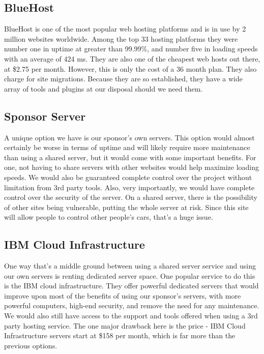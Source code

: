 \documentclass[onecolumn, draftclsnofoot,10pt, compsoc]{IEEEtran}
\begin{document}
    \subsection{BlueHost}
    
        BlueHost is one of the most popular web hosting platforms and is in use by 2 million websites worldwide. 
        Among the top 33 hosting platforms they were number one in uptime at greater than 99.99\%, and number five in loading speeds with an average of 424 ms. 
        They are also one of the cheapest web hosts out there, at \$2.75 per month. 
        However, this is only the cost of a 36 month plan. 
        They also charge for site migrations.
        Because they are so established, they have a wide array of tools and plugins at our disposal should we need them\cite{e9}.
    
    \subsection{Sponsor Server}
    
        A unique option we have is our sponsor's own servers. 
        This option would almost certainly be worse in terms of uptime and will likely require more maintenance than using a shared server, but it would come with some important benefits.
        For one, not having to share servers with other websites would help maximize loading speeds.
        We would also be guaranteed complete control over the project without limitation from 3rd party tools.
        Also, very importantly, we would have complete control over the security of the server.
        On a shared server, there is the possibility of other sites being vulnerable, putting the whole server at risk.
        Since this site will allow people to control other people's cars, that's a huge issue\cite{e10}.
    
    \subsection{IBM Cloud Infrastructure}
    
        One way that's a middle ground between using a shared server service and using our own servers is renting dedicated server space.
        One popular service to do this is the IBM cloud infrastructure.
        They offer powerful dedicated servers that would improve upon most of the benefits of using our sponsor's servers, with more powerful computers, high-end security, and remove the need for any maintenance.
        We would also still have access to the support and tools offered when using a 3rd party hosting service.
        The one major drawback here is the price - IBM Cloud Infrastructure servers start at \$158 per month, which is far more than the previous options\cite{e11}.
    
\end{document}
